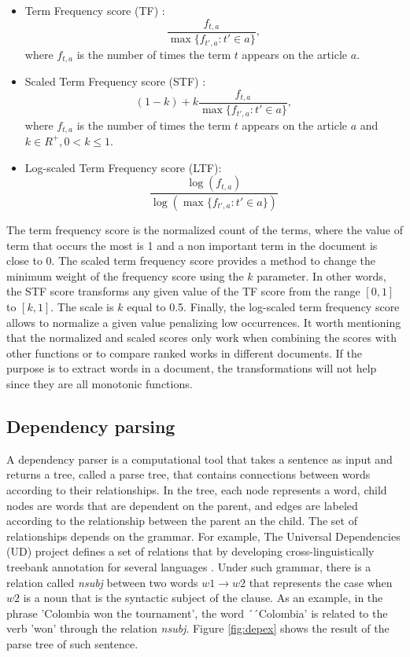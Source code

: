 \documentclass[oribibl]{llncs}
\begin{document}
\begin{itemize}
\item{Term Frequency score (TF) : \[\frac{f_{t,a}}{ \max\{ f_{t',a} : t' \in a \} },\]where $f_{t,a}$ is the number of times the term $t$ appears on the article $a$.}
\item{Scaled Term Frequency score (STF) : \[(1-k) + k\frac{f_{t,a}}{ \max\{ f_{t',a} : t' \in a \} },\]where $f_{t,a}$ is the number of times the term $t$ appears on the article $a$ and $k \in R^+, 0 < k \leq 1 $.}
\item{Log-scaled Term Frequency score (LTF): \[ \frac{\log(f_{t,a}) }{\log(\max\{ f_{t',a} : t' \in a \})}\]}
\end{itemize}
 
The term frequency score is the normalized count of the terms, where the value of term that occurs the most is 1 and a non important term in the document is close to 0. The scaled term frequency score provides a method to change the minimum weight of the frequency score using the $k$ parameter. In other words, the STF score transforms any given value of the TF score from the range $[0,1]$ to $[k,1]$. The scale is  $k$ equal to 0.5. Finally, the log-scaled term frequency score allows to normalize a given value penalizing low occurrences. It worth mentioning that the normalized and scaled scores only work when combining the scores with other functions or to compare ranked works in different documents. If the purpose is to extract words in a document, the transformations will not help since they are all monotonic functions.

\subsection{Dependency parsing} \label{subsec:parsing}

A dependency parser is a computational tool that takes a sentence as input and returns a tree, called a parse tree, that contains connections between words according to their relationships. In the tree, each node represents a word, child nodes are words that are dependent on the parent, and edges are labeled according to the relationship between the parent an the child. The set of relationships depends on the grammar. For example, The Universal Dependencies (UD) project defines a set of relations that by developing cross-linguistically treebank annotation for several languages \cite{Nivre2016}. Under such grammar, there is a relation called {\it nsubj} between two words $w1 \to w2$ that represents the case when $w2$ is a noun that is the syntactic subject of the clause. As an example, in the phrase 'Colombia won the tournament', the word ´´Colombia' is related to the verb 'won' through the relation {\it nsubj}. Figure \ref{fig:depex} shows the result of the parse tree of such sentence.
\end{document}

